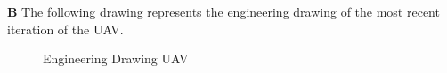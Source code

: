 \documentclass[12pt]{article}
\begin{document}
\noindent \textbf{B} The following drawing represents the engineering drawing of the most recent iteration of the UAV. \\ 

\newpage

\begin{figure}

\caption{Engineering Drawing UAV}
\end{figure}
\end{document}
